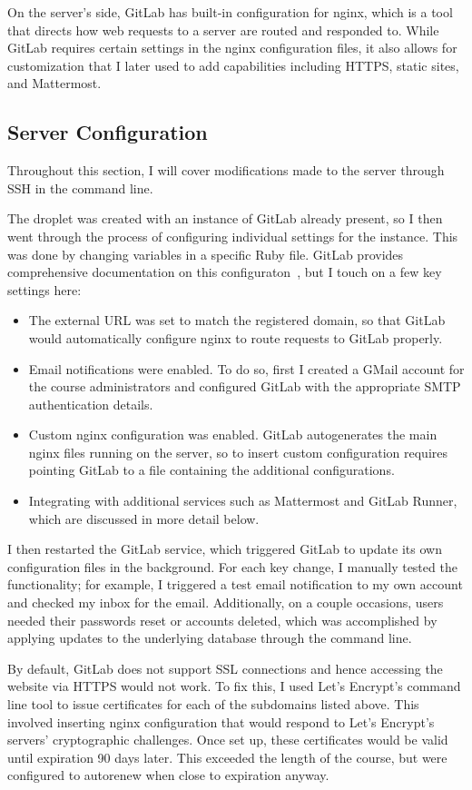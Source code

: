 \documentclass[12pt,twoside]{mitthesis}
\newcommand{\draft}[1]{{\color{blue} #1}}
\begin{document}
{On the server's side, GitLab has built-in configuration for nginx, which is a tool that directs how web requests to a server are routed and responded to. While GitLab requires certain settings in the nginx configuration files, it also allows for customization that I later used to add capabilities including HTTPS, static sites, and Mattermost.}

\subsection{Server Configuration}

\draft{Throughout this section, I will cover modifications made to the server through SSH in the command line.

The droplet was created with an instance of GitLab already present, so I then went through the process of configuring individual settings for the instance. This was done by changing variables in a specific Ruby file. GitLab provides comprehensive documentation on this configuraton~\cite{gitlabdocs}, but I touch on a few key settings here:
\begin{itemize}
\item The external URL was set to match the registered domain, so that GitLab would automatically configure nginx to route requests to GitLab properly.
\item Email notifications were enabled. To do so, first I created a GMail account for the course administrators and configured GitLab with the appropriate SMTP authentication details. 
\item Custom nginx configuration was enabled. GitLab autogenerates the main nginx files running on the server, so to insert custom configuration requires pointing GitLab to a file containing the additional configurations.
\item Integrating with additional services such as Mattermost and GitLab Runner, which are discussed in more detail below.
\end{itemize}
I then restarted the GitLab service, which triggered GitLab to update its own configuration files in the background. For each key change, I manually tested the functionality; for example, I triggered a test email notification to my own account and checked my inbox for the email. Additionally, on a couple occasions, users needed their passwords reset or accounts deleted, which was accomplished by applying updates to the underlying database through the command line.

By default, GitLab does not support SSL connections and hence accessing the website via HTTPS would not work. To fix this, I used Let's Encrypt's command line tool to issue certificates for each of the subdomains listed above. This involved inserting nginx configuration that would respond to Let's Encrypt's servers' cryptographic challenges. Once set up, these certificates would be valid until expiration 90 days later. This exceeded the length of the course, but were configured to autorenew when close to expiration anyway. 

}
\end{document}
